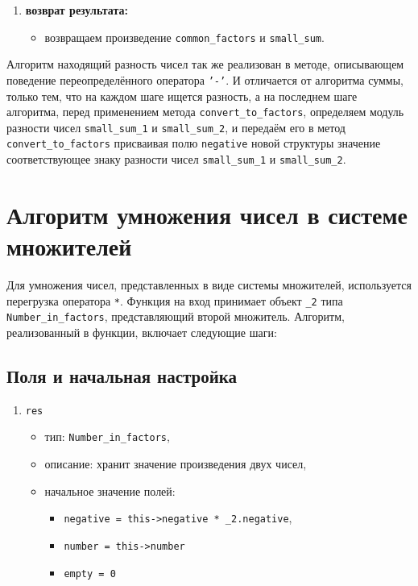 \begin{enumerate}
	\item \textbf{возврат результата:}
	\begin{itemize}
		\item возвращаем произведение \texttt{common\_factors} и \texttt{small\_sum}.
	\end{itemize}
\end{enumerate}

Алгоритм находящий разность чисел так же реализован в методе, описывающем поведение переопределённого оператора \texttt{'-'}. И отличается от алгоритма суммы, только тем, что на каждом шаге ищется разность, а на последнем шаге алгоритма, перед применением метода \texttt{convert\_to\_factors}, определяем модуль разности чисел \texttt{small\_sum\_1} и \texttt{small\_sum\_2}, и передаём его в метод \texttt{convert\_to\_factors} присваивая полю \texttt{negative} новой структуры значение соответствующее знаку разности чисел \texttt{small\_sum\_1} и \texttt{small\_sum\_2}.

\section{Алгоритм умножения чисел в системе множителей}
Для умножения чисел, представленных в виде системы множителей, используется перегрузка оператора \texttt{*}. Функция на вход принимает объект \texttt{\_2} типа \texttt{Number\_in\_factors}, представляющий второй множитель. Алгоритм, реализованный в функции, включает следующие шаги:

\subsection*{Поля и начальная настройка}
\begin{enumerate}
	\item \texttt{res}
	\begin{itemize}
		\item тип: \texttt{Number\_in\_factors},
		\item описание: хранит значение произведения двух чисел,
		\item начальное значение полей:
		\begin{itemize}
			\item \texttt{negative = this->negative * \_2.negative},
			\item \texttt{number = this->number}
			\item \texttt{empty = 0}
		\end{itemize}
	\end{itemize}
\end{enumerate}

